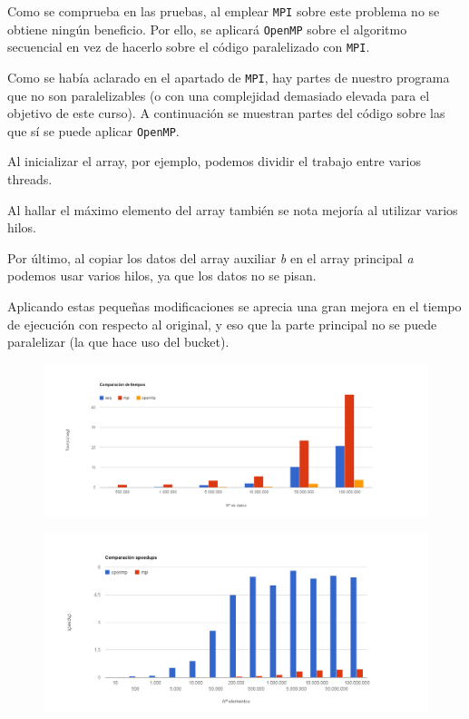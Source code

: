 Como se comprueba en las pruebas, al emplear \texttt{MPI} sobre este problema no se obtiene ningún beneficio. Por ello, se aplicará \texttt{OpenMP} sobre el algoritmo secuencial en vez de hacerlo sobre el código paralelizado con \texttt{MPI}.

Como se había aclarado en el apartado de \texttt{MPI}, hay partes de nuestro programa que no son paralelizables (o con una complejidad demasiado elevada para el objetivo de este curso). A continuación se muestran partes del código sobre las que sí se puede aplicar \texttt{OpenMP}.

Al inicializar el array, por ejemplo, podemos dividir el trabajo entre varios threads.


Al hallar el máximo elemento del array también se nota mejoría al utilizar varios hilos.


Por último, al copiar los datos del array auxiliar \emph{b} en el array principal \emph{a} podemos usar varios hilos, ya que los datos no se pisan.



Aplicando estas pequeñas modificaciones se aprecia una gran mejora en el tiempo de ejecución con respecto al original, y eso que la parte principal no se puede paralelizar (la que hace uso del bucket).

\begin{figure}[h!]
	\centering
	\includegraphics[width=1.3\textwidth]{./res/Comparacion_tiempos}
	\label{Comparacion_tiempos}
\end{figure}

\begin{figure}[h!]
	\centering
	\includegraphics[width=1.3\textwidth]{./res/Comparacion_speedups}
	\label{Comparacion_speedups}
\end{figure}